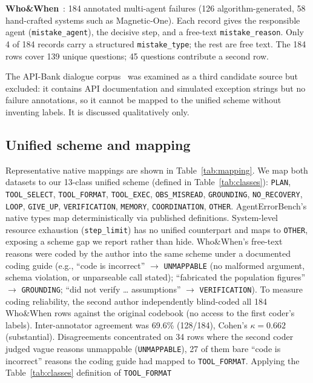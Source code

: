 \documentclass[12pt,letterpaper]{article}
\begin{document}
\textbf{Who\&When}~\cite{zhang2025whowhen}: 184 annotated multi-agent
failures (126 algorithm-generated, 58 hand-crafted systems such as
Magnetic-One). Each record gives the responsible agent
(\texttt{mistake\_agent}), the decisive step, and a free-text
\texttt{mistake\_reason}. Only 4 of 184 records carry a structured
\texttt{mistake\_type}; the rest are free text. The 184 rows cover 139
unique questions; 45 questions contribute a second row.

The API-Bank dialogue corpus~\cite{li2023apibank} was examined as a third
candidate source but excluded: it contains API documentation and simulated
exception strings but no failure annotations, so it cannot be mapped to the
unified scheme without inventing labels. It is discussed qualitatively only.

\subsection{Unified scheme and mapping}
\label{sec:mapping}
Representative native mappings are shown in Table~\ref{tab:mapping}.
We map both datasets to our 13-class unified scheme (defined in
Table~\ref{tab:classes}):
\texttt{PLAN}, \texttt{TOOL\_SELECT}, \texttt{TOOL\_FORMAT},
\texttt{TOOL\_EXEC}, \texttt{OBS\_MISREAD}, \texttt{GROUNDING},
\texttt{NO\_RECOVERY}, \texttt{LOOP}, \texttt{GIVE\_UP},
\texttt{VERIFICATION}, \texttt{MEMORY}, \texttt{COORDINATION},
\texttt{OTHER}. AgentErrorBench's native types map deterministically via
published definitions. System-level resource exhaustion (\texttt{step\_limit}) has no
unified counterpart and maps to \texttt{OTHER}, exposing a scheme gap we
report rather than hide. Who\&When's free-text reasons were coded by the
author into the same scheme under a documented coding guide (e.g., ``code is
incorrect'' $\rightarrow$ \texttt{UNMAPPABLE} (no malformed argument, schema violation, or unparseable call stated); ``fabricated the population
figures'' $\rightarrow$ \texttt{GROUNDING}; ``did not verify \ldots
assumptions'' $\rightarrow$ \texttt{VERIFICATION}). To measure coding
reliability, the second author independently blind-coded all 184 Who\&When
rows against the original codebook (no access to the first coder's labels).
Inter-annotator agreement was 69.6\% (128/184), Cohen's $\kappa=0.662$
(substantial). Disagreements concentrated on 34 rows where the second coder
judged vague reasons unmappable (\texttt{UNMAPPABLE}), 27 of them bare
``code is incorrect'' reasons the coding guide had mapped to \texttt{TOOL\_FORMAT}.
Applying the Table~\ref{tab:classes} definition of \texttt{TOOL\_FORMAT}
\end{document}
